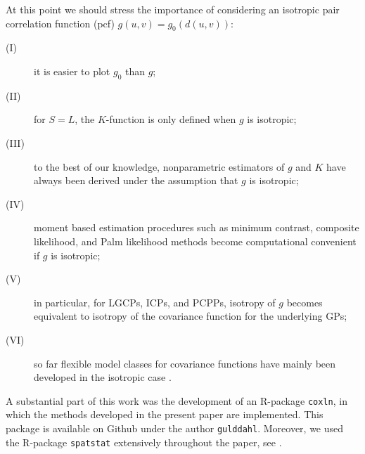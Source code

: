 \documentclass[alpha-refs]{wiley-article}
\begin{document}
At this point we should stress the importance of considering an isotropic pair correlation function (pcf) $g(u,v)=g_0(d(u,v))$:
\begin{description}
\item[(I)] it is easier to plot $g_0$ than $g$;
\item[(II)] for $S=L$, the $K$-function is only defined when $g$ is isotropic;
\item[(III)] to the best of our knowledge, 
 nonparametric estimators of  $g$ and $K$ have always been derived under the assumption that $g$ is isotropic;
\item[(IV)] moment based estimation procedures such as minimum contrast, composite likelihood, and Palm likelihood methods 
\citep[see][and the references therein]{MW07,MW17} 
become computational convenient if $g$ is isotropic;
 \item[(V)] in particular, for LGCPs, ICPs, and PCPPs, isotropy of $g$ becomes equivalent to isotropy of the covariance function for the underlying GPs;
 \item[(VI)] so far flexible model classes for covariance functions have mainly been developed in the isotropic case 
 \citep[an exception is][cf.\ Section~\ref{s:7.1}]{BSW}.
\end{description}

A substantial part of this work was the development of an R-package \texttt{coxln}, in which the methods developed in the present paper are implemented. This package is available on Github under the author \texttt{gulddahl}. Moreover, we used the R-package \texttt{spatstat} extensively throughout the paper, see \cite{spatstat}. 
 
\end{document}
